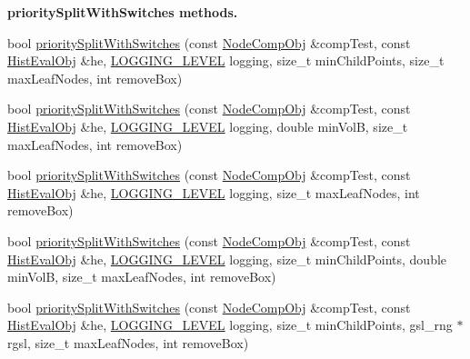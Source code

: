 \begin{Indent}{\bf priority\-Split\-With\-Switches methods.}\par
\begin{DoxyCompactItemize}
\item 
bool \hyperlink{classsubpavings_1_1AdaptiveHistogram_a75ca6c8d7a95525b76b098c8c6e20cf8}{priority\-Split\-With\-Switches} (const \hyperlink{classsubpavings_1_1NodeCompObj}{\-Node\-Comp\-Obj} \&comp\-Test, const \hyperlink{classsubpavings_1_1HistEvalObj}{\-Hist\-Eval\-Obj} \&he, \hyperlink{namespacesubpavings_aef8e51096b59ecaf1a1e9b2ee24b6089}{\-L\-O\-G\-G\-I\-N\-G\-\_\-\-L\-E\-V\-E\-L} logging, size\-\_\-t min\-Child\-Points, size\-\_\-t max\-Leaf\-Nodes, int remove\-Box)
\item 
bool \hyperlink{classsubpavings_1_1AdaptiveHistogram_a0cd2e3af29feaad65d4a0a36738dcc15}{priority\-Split\-With\-Switches} (const \hyperlink{classsubpavings_1_1NodeCompObj}{\-Node\-Comp\-Obj} \&comp\-Test, const \hyperlink{classsubpavings_1_1HistEvalObj}{\-Hist\-Eval\-Obj} \&he, \hyperlink{namespacesubpavings_aef8e51096b59ecaf1a1e9b2ee24b6089}{\-L\-O\-G\-G\-I\-N\-G\-\_\-\-L\-E\-V\-E\-L} logging, double min\-Vol\-B, size\-\_\-t max\-Leaf\-Nodes, int remove\-Box)
\item 
bool \hyperlink{classsubpavings_1_1AdaptiveHistogram_a39ff221f6d3dad036ba6d4f5ec0ae819}{priority\-Split\-With\-Switches} (const \hyperlink{classsubpavings_1_1NodeCompObj}{\-Node\-Comp\-Obj} \&comp\-Test, const \hyperlink{classsubpavings_1_1HistEvalObj}{\-Hist\-Eval\-Obj} \&he, \hyperlink{namespacesubpavings_aef8e51096b59ecaf1a1e9b2ee24b6089}{\-L\-O\-G\-G\-I\-N\-G\-\_\-\-L\-E\-V\-E\-L} logging, size\-\_\-t max\-Leaf\-Nodes, int remove\-Box)
\item 
bool \hyperlink{classsubpavings_1_1AdaptiveHistogram_aa1b1ab0c522e46bc4bd0ab45547dea6b}{priority\-Split\-With\-Switches} (const \hyperlink{classsubpavings_1_1NodeCompObj}{\-Node\-Comp\-Obj} \&comp\-Test, const \hyperlink{classsubpavings_1_1HistEvalObj}{\-Hist\-Eval\-Obj} \&he, \hyperlink{namespacesubpavings_aef8e51096b59ecaf1a1e9b2ee24b6089}{\-L\-O\-G\-G\-I\-N\-G\-\_\-\-L\-E\-V\-E\-L} logging, size\-\_\-t min\-Child\-Points, double min\-Vol\-B, size\-\_\-t max\-Leaf\-Nodes, int remove\-Box)
\item 
bool \hyperlink{classsubpavings_1_1AdaptiveHistogram_a5299ade7c1d409621b2204a1986dabd8}{priority\-Split\-With\-Switches} (const \hyperlink{classsubpavings_1_1NodeCompObj}{\-Node\-Comp\-Obj} \&comp\-Test, const \hyperlink{classsubpavings_1_1HistEvalObj}{\-Hist\-Eval\-Obj} \&he, \hyperlink{namespacesubpavings_aef8e51096b59ecaf1a1e9b2ee24b6089}{\-L\-O\-G\-G\-I\-N\-G\-\_\-\-L\-E\-V\-E\-L} logging, size\-\_\-t min\-Child\-Points, gsl\-\_\-rng $\ast$rgsl, size\-\_\-t max\-Leaf\-Nodes, int remove\-Box)

\end{DoxyCompactItemize}
\end{Indent}
